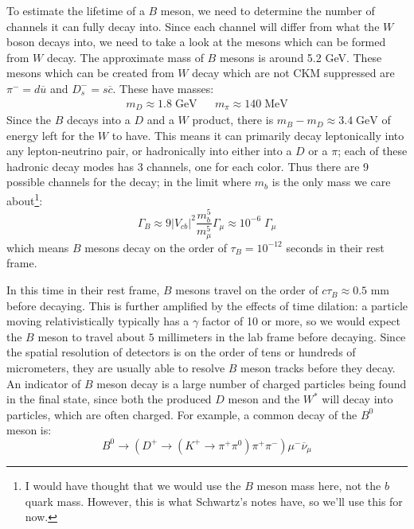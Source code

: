 \documentclass[11pt, oneside]{article}   	%
\theoremstyle{definition}
\numberwithin{equation}{subsection}		%
\begin{document}
To estimate the lifetime of a $B$ meson, we need to determine the number of channels it can fully decay into. Since each channel will 
differ from what the $W$ boson decays into, we need to take a look at the mesons which can be formed from $W$ decay. The approximate 
mass of $B$ mesons is around 5.2 GeV. These mesons which can be created from $W$ decay which are not CKM suppressed are 
$\pi^- = d\overline u$ and $D_s^- = s\overline c$. These have masses:
\begin{align}
	m_{D}\approx 1.8\;\mathrm{GeV} && m_\pi\approx 140\;\mathrm{MeV}
\end{align}
Since the $B$ decays into a $D$ and a $W$ product, there is $m_B - m_D\approx 3.4\;\mathrm{GeV}$ of energy left for the $W$ to have. 
This means it can primarily decay leptonically into any lepton-neutrino pair, or hadronically into either into a $D$ or a $\pi$; each of these 
hadronic decay modes has 3 channels, one for each color. Thus there are 9 possible channels for the decay; in the limit where $m_b$ is 
the only mass we care about\footnote{I would have thought that we would use the $B$ meson mass here, not the $b$ quark mass. However, this is what Schwartz's notes have, so we'll use this for now.}:
\begin{equation}
	\Gamma_B\approx 9 |V_{cb}|^2\frac{m_b^5}{m_\mu^5} \Gamma_\mu\approx 10^{-6} \;\Gamma_\mu
\end{equation}
which means $B$ mesons decay on the order of $\tau_B = 10^{-12}$ seconds in their rest frame. 

In this time in their rest frame, $B$ mesons travel on the order of $c\tau_B \approx 0.5$ mm before decaying. This is further amplified by the 
effects of time dilation: a particle moving relativistically typically has a $\gamma$ factor of 10 or more, so we would expect the $B$ meson 
to travel about $5$ millimeters in the lab frame before decaying. Since the spatial resolution of detectors is on the order of tens or 
hundreds of micrometers, they are usually able to resolve $B$ meson tracks before they decay. An indicator of $B$ meson decay is 
a large number of charged particles being found in the final state, since both the produced $D$ meson and the $W^*$ will decay into 
particles, which are often charged. For example, a common decay of the $B^0$ meson is:
\begin{equation}
	B^0\rightarrow (D^+\rightarrow (K^+\rightarrow\pi^+\pi^0) \pi^+\pi^-)\mu^-\overline \nu_\mu
\end{equation}
\end{document}
